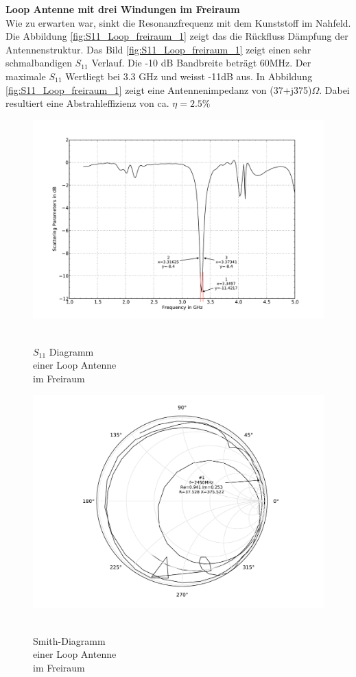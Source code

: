 \textbf{Loop Antenne mit drei Windungen im Freiraum}\\
Wie zu erwarten war, sinkt die Resonanzfrequenz mit dem Kunststoff im Nahfeld. Die Abbildung \ref{fig:S11_Loop_freiraum_1} zeigt das die Rückfluss Dämpfung der Antennenstruktur. Das Bild \ref{fig:S11_Loop_freiraum_1} zeigt einen sehr schmalbandigen $S_{11}$ Verlauf. Die -10 dB Bandbreite beträgt 60MHz. Der maximale $S_{11}$ Wertliegt bei 3.3 GHz und weisst -11dB aus. In Abbildung \ref{fig:S11_Loop_freiraum_1} zeigt eine Antennenimpedanz von (37+j375)$\Omega$. Dabei resultiert eine Abstrahleffizienz von ca. $\eta=2.5\%$
\begin{figure}[!h]
\begin{center}
  \includegraphics[width=\linewidth]{content/bilder/Evaluation/Loop/ohneABS/S11_Loop_Coil_ohneABS.pdf}
  \caption{\\$S_{11}$ Diagramm \\einer Loop Antenne \\ im Freiraum}\label{fig:S11_Loop_freiraum_1}
\endminipage%
{}
  \includegraphics[width=\linewidth]{content/bilder/Evaluation/Loop/ohneABS/Smith_Loop_Coil_ohneABS.pdf}
  \caption{\\Smith-Diagramm \\einer Loop Antenne \\ im Freiraum}\label{fig:Smith_Loop_freiraum_2}
\endminipage
\end{center}
\end{figure}

